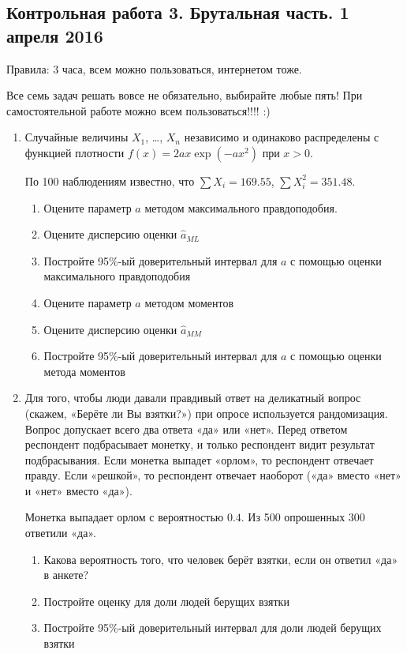 \documentclass[12pt, a4paper]{article}\usepackage[]{graphicx}\usepackage[]{color}
\begin{document}
\subsection{Контрольная работа 3. Брутальная часть. 1 апреля 2016}

Правила: 3 часа, всем можно пользоваться, интернетом тоже.

Все семь задач решать вовсе не обязательно, выбирайте любые пять! При самостоятельной работе можно всем пользоваться!!!! :)

\begin{enumerate}

\item Случайные величины $X_1$, \ldots, $X_n$ независимо и одинаково распределены с функцией плотности $f(x)=2ax\exp(-ax^2)$ при $x>0$.



По 100 наблюдениям известно, что $\sum X_i = 169.55$, $\sum X_i^2 = 351.48$.

\begin{enumerate}
\item Оцените параметр $a$ методом максимального правдоподобия.
\item Оцените дисперсию оценки $\hat a_{ML}$
\item Постройте 95\%-ый доверительный интервал для $a$ с помощью оценки максимального правдоподобия
\item Оцените параметр $a$ методом моментов
\item Оцените дисперсию оценки $\hat a_{MM}$
\item Постройте 95\%-ый доверительный интервал для $a$ с помощью оценки метода моментов
\end{enumerate}

\item Для того, чтобы люди давали правдивый ответ на деликатный вопрос (скажем, «Берёте ли Вы взятки?») при опросе используется рандомизация. Вопрос допускает всего два ответа «да» или «нет». Перед ответом респондент подбрасывает монетку, и только респондент видит результат подбрасывания. Если монетка выпадет «орлом», то респондент отвечает правду. Если «решкой», то респондент отвечает наоборот («да» вместо «нет» и «нет» вместо «да»).

Монетка выпадает орлом с вероятностью $0.4$. Из 500 опрошенных 300 ответили «да».

\begin{enumerate}
\item Какова вероятность того, что человек берёт взятки, если он ответил «да» в анкете?
\item Постройте оценку для доли людей берущих взятки
\item Постройте 95\%-ый доверительный интервал для доли людей берущих взятки
\end{enumerate}


\end{enumerate}
\end{document}
